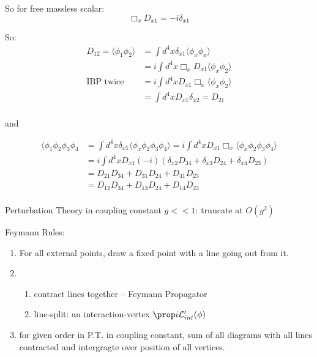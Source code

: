 So for free massless scalar:
\[
    \Box_xD_{x1} = -i\delta_{x1}
    \]

So:
\begin{equation}
    \begin{aligned}
	D_{12} = \langle\phi_1\phi_2\rangle &= \int d^4x\delta_{x1}\langle\phi_x\phi_x\rangle	\\
	&= i\int d^4x\Box_xD_{x1}\langle\phi_x\phi_2\rangle \\
	\text{IBP twice} &= i\int d^4xD_{x1}\Box_x\langle\phi_x\phi_2\rangle \\
	&= \int d^4xD_{x1}\delta_{x2} = D_{21}	\\
    \end{aligned}
\end{equation}

and 

\[
    \begin{aligned}
	\langle\phi_1\phi_2\phi_3\phi_4 &= \int d^4x\delta_{x1}\langle\phi_x\phi_2\phi_3\phi_4\rangle 
	= i\int d^4xD_{x1}\Box_x\langle\phi_x\phi_2\phi_3\phi_4\rangle	\\
	&= i\int d^4xD_{x1}(-i)(\delta_{x2}D_{34}+\delta_{x3}D_{24}+\delta_{x4}D_{23}) \\
	&= D_{21}D_{34} + D_{31}D_{24} + D_{41}D_{23}	\\
	&= D_{12}D_{34} + D_{13}D_{24} + D_{14}D_{23}	\\
    \end{aligned}
    \]

Perturbation Theory in coupling constant $g<<1$: truncate at $O(g^2)$

Feymann Rules:
\begin{enumerate}
    \item For all external points, draw a fixed point with a line going out from it.
    \item 
	\begin{enumerate}
	    \item contract lines together -- Feymann Propagator
	    \item line-split: an interaction-vertex $\prop i\mathcal{L}'_{int}(\phi)$
	\end{enumerate}
    \item for given order in P.T. in coupling constant, sum of all diagrams with all lines contracted 
	and intergragte over position of all vertices.
\end{enumerate}

